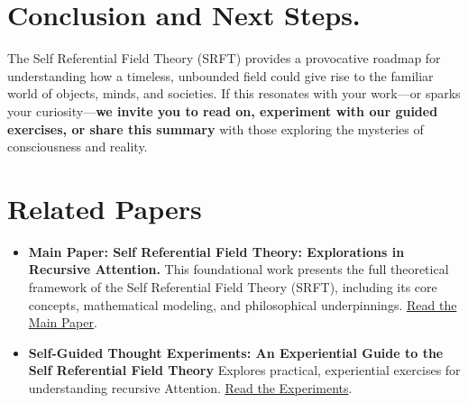 \documentclass[12pt]{article}
\begin{document}
\medskip
\medskip
\noindent
\section*{Conclusion and Next Steps.}
The Self Referential Field Theory (SRFT) provides a provocative roadmap for 
understanding how a timeless, unbounded field could give rise to the 
familiar world of objects, minds, and societies. If this resonates with 
your work—or sparks your curiosity—\textbf{we invite you to read on, 
experiment with our guided exercises, or share this summary} with those 
exploring the mysteries of consciousness and reality.

\section*{Related Papers}
\begin{itemize}
    \item \textbf{Main Paper: Self Referential Field Theory: Explorations in Recursive Attention.}  
    This foundational work presents the full theoretical framework of the Self Referential Field Theory (SRFT), including its core concepts, mathematical modeling, and philosophical underpinnings.  
    \href{https://doi.org/10.31219/osf.io/abcd1}{Read the Main Paper}.
    \item \textbf{Self-Guided Thought Experiments: An
Experiential Guide to the Self Referential Field Theory} Explores practical, experiential exercises for understanding recursive Attention. 
   \href{https://doi.org/10.31219/osf.io/abcd1}{Read the Experiments}.
\end{itemize}
\end{document}
